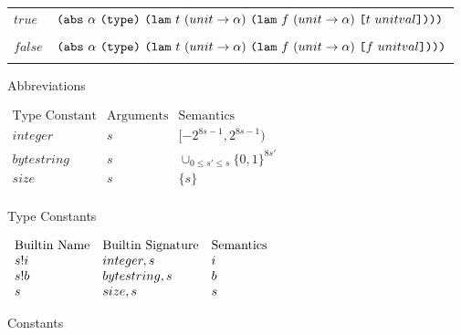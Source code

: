 \documentclass[../main.tex]{subfiles}
\begin{document}
\begin{figure*}[t]
\begin{tabular}{ll}
        $true$ & \(\texttt{(} \texttt{abs} ~ \alpha ~ \texttt{(} \texttt{type} \texttt{)}{} ~ \texttt{(} \texttt{lam} ~ t ~ (unit \to \alpha) ~ \texttt{(} \texttt{lam} ~ f ~ (unit \to \alpha) ~ \texttt{[} t ~ unitval \texttt{]} \texttt{)} \texttt{)} \texttt{)}\)\\\\
        
        $false$ & \(\texttt{(} \texttt{abs} ~ \alpha ~ \texttt{(} \texttt{type} \texttt{)}{} ~ \texttt{(} \texttt{lam} ~ t ~ (unit \to \alpha) ~ \texttt{(} \texttt{lam} ~ f ~ (unit \to \alpha) ~ \texttt{[} f ~ unitval \texttt{]} \texttt{)} \texttt{)} \texttt{)}\)\\\\
        
    \end{tabular}
    
    \caption{Abbreviations}
    \label{fig:Plutus_core_type_abbreviations}
\end{figure*}

\begin{figure*}[t]
    
    
    \(\begin{array}{lllll}
        \textrm{Type Constant} & \textrm{Arguments} & \textrm{Semantics}\\
        
        integer & s & [-2^{8s-1},2^{8s-1})\\
        
        bytestring & s & \cup_{0\leq s' \leq s}\{0,1\}^{8s'}\\
        
        size & s & \{s\}\\
   \end{array}\)
   \caption{Type Constants}
   \label{fig:Plutus_core_type_constants}
    
\end{figure*}

\begin{figure*}
   \(\begin{array}{lllll}
        \textrm{Builtin Name} & \textrm{Builtin Signature} & \textrm{Semantics}\\
        s!i   & integer,s & i\\
        s!b   & bytestring,s & b\\
        s     & size,s & s\\
    \end{array}\)
    \caption{Constants}
    \label{fig:Plutus_core_constants}
\end{figure*}
\end{document}
